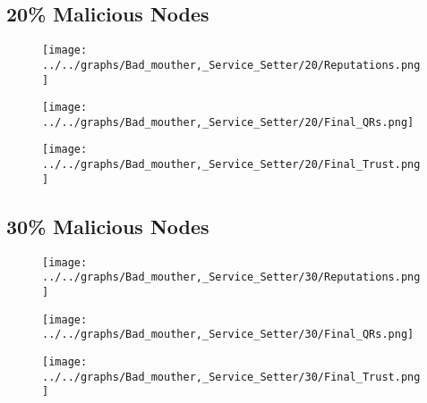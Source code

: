\begin{minipage}[t]{0.49\columnwidth}
\subsection*{20\% Malicious Nodes}
    \begin{figure}[H]
        \centering
        \texttt{[image: ../../graphs/Bad\_mouther,\_Service\_Setter/20/Reputations.png]}
    \end{figure}
    \begin{figure}[H]
        \centering
        \texttt{[image: ../../graphs/Bad\_mouther,\_Service\_Setter/20/Final\_QRs.png]}
    \end{figure}
\end{minipage}
\begin{minipage}[t]{0.49\columnwidth}
    \begin{figure}[H]
        \centering
        \texttt{[image: ../../graphs/Bad\_mouther,\_Service\_Setter/20/Final\_Trust.png]}
    \end{figure}
\end{minipage}

\begin{minipage}[t]{0.49\columnwidth}
\subsection*{30\% Malicious Nodes}
    \begin{figure}[H]
        \centering
        \texttt{[image: ../../graphs/Bad\_mouther,\_Service\_Setter/30/Reputations.png]}
    \end{figure}
    \begin{figure}[H]
        \centering
        \texttt{[image: ../../graphs/Bad\_mouther,\_Service\_Setter/30/Final\_QRs.png]}
    \end{figure}
\end{minipage}
\begin{minipage}[t]{0.49\columnwidth}
    \begin{figure}[H]
        \centering
        \texttt{[image: ../../graphs/Bad\_mouther,\_Service\_Setter/30/Final\_Trust.png]}
    \end{figure}
\end{minipage}

